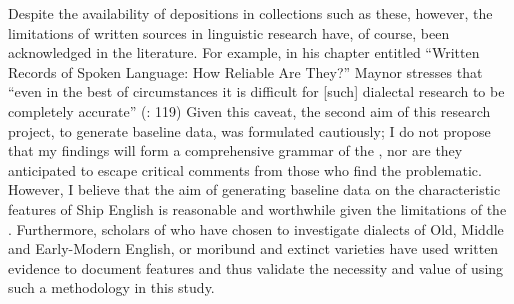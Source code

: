 Despite the availability of depositions in collections such as these, however, the limitations of written sources in linguistic research have, of course, been acknowledged in the literature. For example, in his chapter entitled “Written Records of Spoken Language: How Reliable Are They?” Maynor stresses that “even in the best of circumstances it is difficult for [such] dialectal research to be completely accurate” (\citeyear{Maynor1988}: 119) Given this caveat, the second aim of this research project, to generate baseline data, was formulated cautiously; I do not propose that my findings will form a comprehensive grammar of the , nor are they anticipated to escape critical comments from those who find the  problematic. However, I believe that the aim of generating baseline data on the characteristic features of Ship English is reasonable and worthwhile given the limitations of the . Furthermore, scholars of  who have chosen to investigate dialects of Old, Middle and Early-Modern English, or moribund and extinct varieties have used written evidence to document features and thus validate the necessity and value of using such a methodology in this study. 

